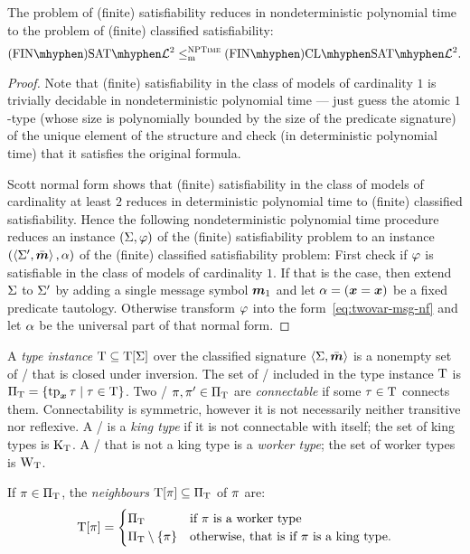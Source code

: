 \begin{remark}
The problem of (finite) satisfiability reduces in nondeterministic polynomial
time to the problem of (finite) classified satisfiability:
\[
  \FinASat{\vFo2} \red\cNP \FinAClSat{\vFo2}.
\]
\end{remark}
\begin{proof}

Note that (finite) satisfiability in the class of models of cardinality $1$ is
trivially decidable in nondeterministic polynomial time --- just guess the
atomic $1$-type (whose size is polynomially bounded by the size of the
predicate signature) of the unique element of the structure and check (in
deterministic polynomial time) that it satisfies the original formula.

Scott normal form shows that (finite) satisfiability in the class of models of
cardinality at least $2$ reduces in deterministic polynomial time to (finite)
classified satisfiability.
Hence the following nondeterministic polynomial time procedure reduces an
instance $(\mathrm{\Sigma}, \varphi)$ of the (finite) satisfiability problem to an instance
$(\left\langle \mathrm{\Sigma'},\bar{\bm{m}} \right\rangle, \alpha)$ of the (finite) classified satisfiability problem:
First check if $\varphi$ is satisfiable in the class of models of cardinality $1$.
If that is the case, then extend $\mathrm{\Sigma}$ to $\mathrm{\Sigma'}$ by adding a single message
symbol $\bm{m}_{1}$ and let $\alpha = (\bm{x} = \bm{x})$ be a fixed predicate tautology.
Otherwise transform $\varphi$ into the form~\cref{eq:twovar-msg-nf} and let
$\alpha$ be the universal part of that normal form.
\end{proof}

A \emph{type instance} $\mathrm{T} \subseteq \mathrm{T}[\mathrm{\Sigma}]$ over the classified signature
$\left\langle \mathrm{\Sigma},\bar{\bm{m}} \right\rangle$ is a nonempty set of \twotypes/ that is closed under
inversion.
The set of \onetypes/ included in the type instance $\mathrm{T}$ is
${\Pi}_{\mathrm{T}} = \left\{\operatorname{tp}_{\bm{x}}\tau\mathrel{}\middle|\mathrel{}\tau\in\mathrm{T}\right\}$.
Two \onetypes/ $\pi,{\pi'} \in {\Pi}_{\mathrm{T}}$ are \emph{connectable} if some
$\tau\in\mathrm{T}$ connects them.
Connectability is symmetric, however it is not necessarily neither transitive
nor reflexive.
A \onetype/ is a \emph{king type} if it is not connectable with itself;
the set of king types is ${\mathrm{K}}_{\mathrm{T}}$.
A \onetype/ that is not a king type is a \emph{worker type};
the set of worker types is ${\mathrm{W}}_{\mathrm{T}}$.

If $\pi\in{\Pi}_{\mathrm{T}}$, the \emph{neighbours} $\mathrm{T}[\pi]\subseteq{\Pi}_{\mathrm{T}}$ of $\pi$
are:
\[
  \mathrm{T}[\pi] = \begin{cases}
    {\Pi}_{\mathrm{T}} &\text{if } \pi \text{ is a worker type} \\
    {\Pi}_{\mathrm{T}} \setminus \left\{\pi\right\} &\text{otherwise, that is if } \pi \text{ is a king
    type.}
  \end{cases}
\]


